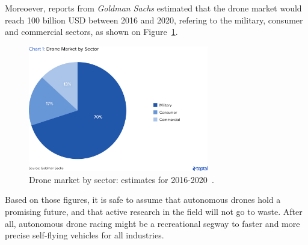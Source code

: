 Moreoever, reports from \emph{Goldman Sachs} \cite{TopTal} estimated that the
drone market would reach 100 billion USD between 2016 and 2020, refering to the
military, consumer and commercial sectors, as shown on
Figure~\ref{fig:toptal}.\\

\begin{figure}[h]
	\centering
	\includegraphics[width=0.7\textwidth]{figure/toptal.png}
	\caption{Drone market by sector: estimates for 2016-2020~\cite{TopTal}.}
	\label{fig:toptal}
\end{figure}

Based on those figures, it is safe to assume that autonomous drones hold a
promising future, and that active research in the field will not go to waste.
After all, autonomous drone racing might be a recreational segway to faster and
more precise self-flying vehicles for all industries.
